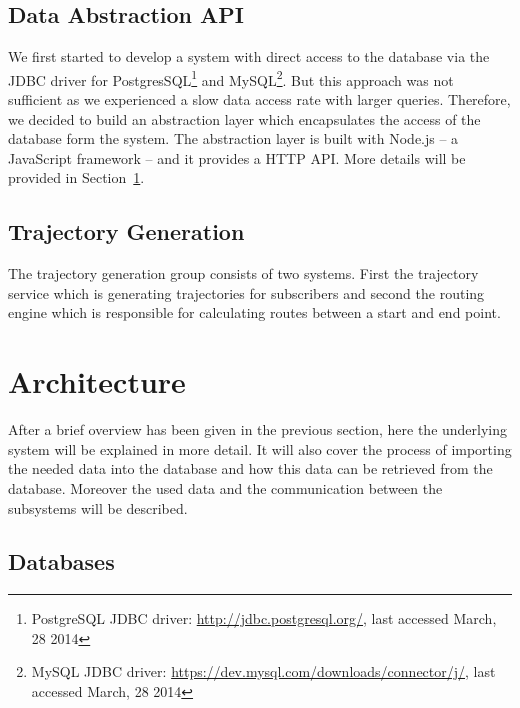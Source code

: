\documentclass[master,english]{hgbthesis}
\begin{document}
\subsection{Data Abstraction API}
We first started to develop a system with direct access to the database via the JDBC driver for PostgresSQL\footnote{PostgreSQL JDBC driver: \url{http://jdbc.postgresql.org/}, last accessed March, 28 2014} and MySQL\footnote{MySQL JDBC driver: \url{https://dev.mysql.com/downloads/connector/j/}, last accessed March, 28 2014}. But this approach was not sufficient as we experienced a slow data access rate with larger queries. Therefore, we decided to build an abstraction layer which encapsulates the access of the database form the system. The abstraction layer is built with Node.js -- a JavaScript framework -- and it provides a HTTP API. More details will be provided in Section~\ref{sec:architecture}.
\subsection{Trajectory Generation}
The trajectory generation group consists of two systems. First the trajectory service which is generating trajectories for subscribers and second the routing engine which is responsible for calculating routes between a start and end point. 
\section{Architecture}
\label{sec:architecture}
After a brief overview has been given in the previous section, here the underlying system will be explained in more detail. It will also cover the process of importing the needed data into the database and how this data can be retrieved from the database. Moreover the used data and the communication between the subsystems will be described.
\subsection{Databases}
\end{document}
